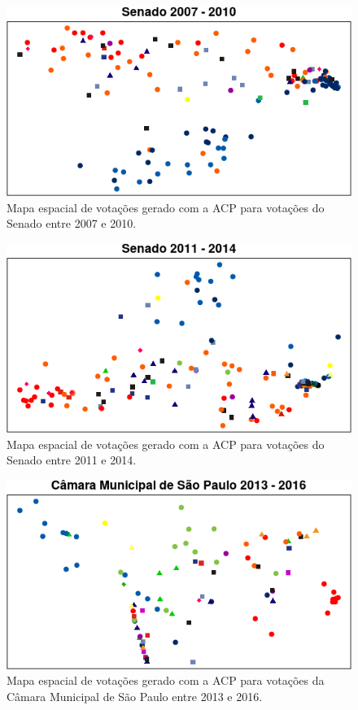 \documentclass[a4paper, 12pt]{article}
\begin{document}
\begin{figure}[h!]
  \centering
  \includegraphics[scale=0.9]{figs/sen2007-2010.png}
  \caption{Mapa espacial de votações gerado com a ACP para votações do Senado entre 2007 e 2010.}
  \label{fig:sen2007-2010}
\end{figure}

\begin{figure}[h!]
  \centering
  \includegraphics[scale=0.9]{figs/sen2011-2014.png}
  \caption{Mapa espacial de votações gerado com a ACP para votações do Senado entre 2011 e 2014.}
  \label{fig:sen2011-2014}
\end{figure}

\begin{figure}[h!]
  \centering
  \includegraphics[scale=0.9]{figs/cmsp2013-2016.png}
  \caption{Mapa espacial de votações gerado com a ACP para votações da Câmara Municipal de São Paulo entre 2013 e 2016.}
  \label{fig:cmsp2013-2016}
\end{figure}
\end{document}

